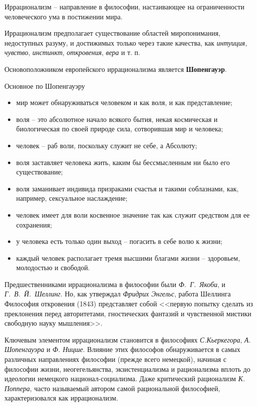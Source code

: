 
Иррационализм -- направление в философии, настаивающее на ограниченности человеческого ума в постижении мира. 

Иррационализм предполагает существование областей миропонимания, недоступных разуму, и достижимых только 
через такие качества, как \emph{интуиция}, \emph{чувство}, \emph{инстинкт}, \emph{откровения}, 
\emph{вера} и т. п.

Основоположником европейского иррационализма является \textbf{Шопенгауэр}. 

Основное по Шопенгауэру
\begin{itemize}
    \itemsep-1ex
    \item мир может обнаруживаться человеком и как воля, и как представление;
    \item воля -- это абсолютное начало всякого бытия, некая космическая и биологическая по своей природе 
        сила, сотворившая мир и человека;
    \item человек -- раб воли, поскольку служит не себе, а Абсолюту;
    \item воля заставляет человека жить, каким бы бессмысленным ни было его существование;
    \item воля заманивает индивида призраками счастья и такими соблазнами, как, например, сексуальное 
        наслаждение;
    \item человек имеет для воли косвенное значение так как служит средством для ее сохранения;
    \item у человека есть только один выход -- погасить в себе волю к жизни;
    \item каждый человек располагает тремя высшими благами жизни -- здоровьем, молодостью и свободой.
\end{itemize}

Предшественниками иррационализма в философии были \emph{Ф.~Г.~Якоби}, и \emph{Г.~В.~Й.~Шеллинг}.
Но, как утверждал \emph{Фридрих Энгельс}, работа Шеллинга Философия откровения 
(1843) представляет собой <<первую попытку сделать из преклонения перед авторитетами, гностических фантазий 
и чувственной мистики свободную науку мышления>>.

Ключевым элементом иррационализм становится в философиях \emph{С.Кьеркегора}, \emph{А. Шопенгауэра} и 
\emph{Ф. Ницше}. Влияние этих философов обнаруживается в самых различных направлениях философии (прежде 
всего немецкой), начиная с философии жизни, неогегельянства, экзистенциализма и рационализма вплоть до 
идеологии немецкого национал-социализма. Даже критический рационализм \emph{К. Поппера}, часто называемый 
автором самой рациональной философией, характеризовался как иррационализм.

